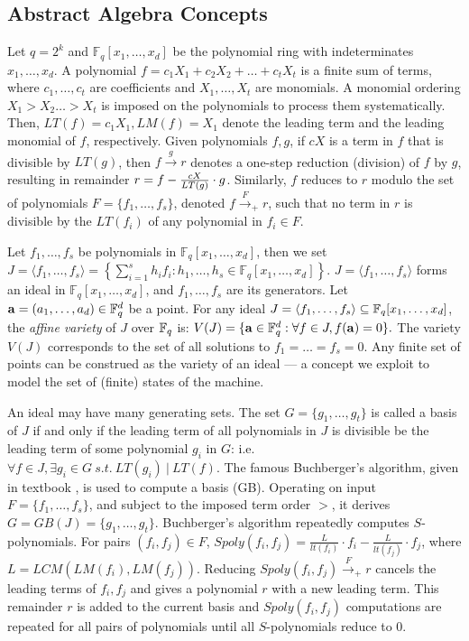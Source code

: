 \appendix

\subsection{Abstract Algebra Concepts}
Let $q = 2^k$ and $\mathbb F_{q}[x_1,\dots, x_d]$ be the polynomial
ring with indeterminates $x_1,\dots,x_d$. A polynomial $f = c_1 X_1 +
c_2 X_2 + \dots + c_t X_t$ is a finite sum of terms, where $c_1,
\dots, c_t$ are coefficients and $X_1, \dots, X_t$ are monomials. A
monomial ordering $X_1 > X_2 \dots > X_t$ is imposed on the
polynomials to process them systematically. Then, $LT(f) = c_1 X_1,
LM(f) = X_1$ denote the leading term and the leading monomial of $f$,
respectively. Given polynomials $f, g$, if $cX$ is a term in $f$ that
is divisible by $LT(g)$, 
then $f \xrightarrow{g} r$ denotes a one-step reduction (division) of
$f$ by $g$, resulting in remainder $r = f - {{cX} \over {LT(g)}} \cdot
g$. Similarly, $f$ reduces to $r$ modulo the set of polynomials $F =
\{f_1, \dots, f_s\}$, denoted $f \stackrel{F} {\textstyle
  \longrightarrow}_+ r$, such that no term in $r$ is divisible by the
$LT(f_i)$ of any polynomial in $ f_i \in F$.   

Let $f_1,\dots, f_s$ be polynomials in $\mathbb F_q[x_1,\dots,x_d]$,
then we set $J = \langle f_1,\dots, f_s\rangle = \left\{\sum_{i=1}^s
h_if_i:h_1,\dots,h_s \in \mathbb F_q[x_1,\dots,x_d]\right\}$.  $J =
\langle f_1,\dots, f_s\rangle$ forms an ideal in $\mathbb
F_{q}[x_1,\dots, x_d]$, and $f_1,\dots, f_s$ are its generators.  
Let $\mathbf{a} = (a_1, \dots, a_d) \in {\mathbb{F}}_{q}^d$ be a point. For any
ideal $J = \langle f_1, \dots, f_s \rangle \subseteq 
{\mathbb{F}}_{q}[x_1,\dots, x_d]$, the {\it affine variety} of $J$ over
${\mathbb{F}}_{q}$ is: 
$V(J) = \{\mathbf{a} \in {\mathbb{F}}_{q}^d: \forall f \in
J, f(\mathbf{a}) = 0\}.$ The variety $V(J)$ corresponds to
the set of all solutions to $f_1 = \dots = f_s = 0$. Any finite set of
points can be construed as the variety of an ideal --- a concept we
exploit to model the  set of (finite) states of the machine. 

An ideal may have many generating sets. The set $G = \{g_1, \dots,
g_t\}$ is called a \Grobner basis of $J$ if and only if the
leading term of all polynomials in $J$ is divisible be the leading
term of some polynomial $g_i$ in $G$: i.e. $\forall f \in J, \exists
g_i \in G \ s.t. \ LT(g_i) ~|~ LT(f)$. The famous Buchberger's
algorithm, given in textbook \cite{ideals:book}, is used to compute a
\Grobner basis (GB). Operating on  input $F = \{f_1, \dots, f_s\}$,
and subject to the imposed term order $>$, it derives $G = GB(J) = \{
g_1, \dots, g_t \}$. Buchberger's algorithm repeatedly computes
$S$-polynomials. For pairs $(f_i, f_j) \in F$, $Spoly(f_i, f_j) =
\frac{L}{lt(f_i)}\cdot f_i - \frac{L}{lt(f_j)}\cdot f_j$, where $L =
LCM(LM(f_i), LM(f_j))$. Reducing $Spoly(f_i, f_j) \xrightarrow{F}_+ r$
cancels the leading terms of $f_i, f_j$ and gives a polynomial $r$
with a new leading term. This remainder $r$ is added to the current
basis and $Spoly(f_i, f_j)$ computations are repeated for all pairs of
polynomials until all $S$-polynomials reduce to 0.  

